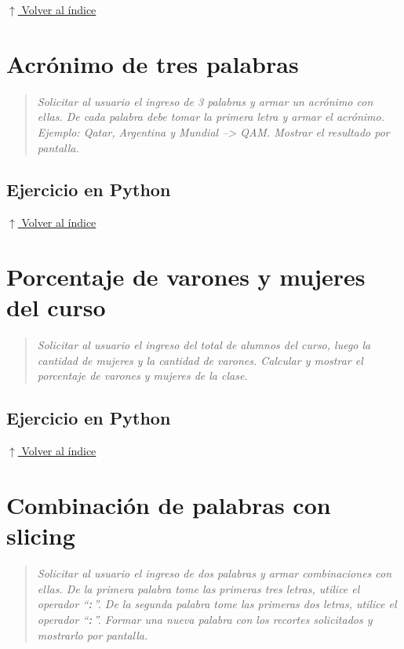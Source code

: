 \documentclass[12pt]{article}
\newcommand{\codigopython}[2]{%
}
\newcommand{\volverindice}{%
    \vspace{1em}%
    \begin{flushright}%
        \hyperlink{indice}{\small $\uparrow$ Volver al índice}%
    \end{flushright}%
}
\newcommand{\enunciado}[1]{%
    \begin{quote}
        \itshape #1
    \end{quote}
}
\begin{document}
\codigopython{08}{Área de un triángulo}

\volverindice
\newpage


\section{Acrónimo de tres palabras}

\enunciado{Solicitar al usuario el ingreso de 3 palabras y armar un acrónimo con ellas. De cada palabra debe tomar la primera letra y armar el acrónimo. Ejemplo: Qatar, Argentina y Mundial --> QAM. Mostrar el resultado por pantalla.}

\subsection*{Ejercicio en Python}

\codigopython{09}{Acrónimo de tres palabras}

\volverindice
\newpage


\section{Porcentaje de varones y mujeres del curso}

\enunciado{Solicitar al usuario el ingreso del total de alumnos del curso, luego la cantidad de mujeres y la cantidad de varones. Calcular y mostrar el porcentaje de varones y mujeres de la clase.}

\subsection*{Ejercicio en Python}

\codigopython{10}{Porcentaje de varones y mujeres del curso}

\volverindice
\newpage


\section{Combinación de palabras con slicing}

\enunciado{Solicitar al usuario el ingreso de dos palabras y armar combinaciones con ellas. De la primera palabra tome las primeras tres letras, utilice el operador \enquote{\texttt{:}}. De la segunda palabra tome las primeras dos letras, utilice el operador \enquote{\texttt{:}}. Formar una nueva palabra con los recortes solicitados y mostrarlo por pantalla.}
\end{document}
